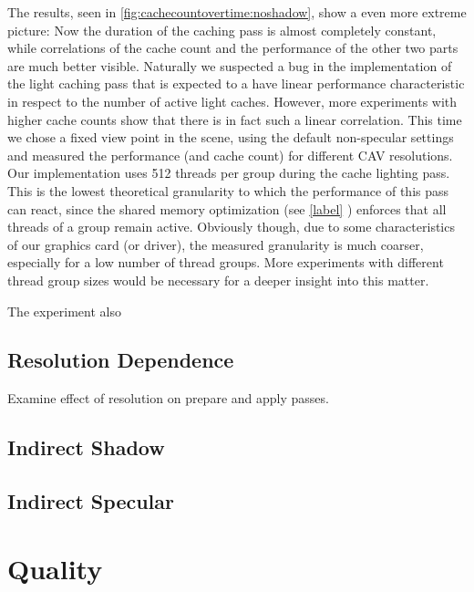 \documentclass[thesis.tex]{subfiles}
\begin{document}
The results, seen in \autoref{fig:cachecountovertime:noshadow}, show a even more extreme picture:
Now the duration of the caching pass is almost completely constant, while correlations of the cache count and the performance of the other two parts are much better visible.
Naturally we suspected a bug in the implementation of the light caching pass that is expected to a have linear performance characteristic in respect to the number of active light caches.
However, more experiments with higher cache counts show that there is in fact such a linear correlation.
This time we chose a fixed view point in the  scene, using the default non-specular settings and measured the performance (and cache count) for different CAV resolutions.
Our implementation uses 512 threads per group during the cache lighting pass.
This is the lowest theoretical granularity to which the performance of this pass can react, since the shared memory optimization (see \autoref{label} \todo{}) enforces that all threads of a group remain active.
Obviously though, due to some characteristics of our graphics card (or driver), the measured granularity is much coarser, especially for a low number of thread groups.
More experiments with different thread group sizes would be necessary for a deeper insight into this matter.

The experiment also %




\subsection{Resolution Dependence}
Examine effect of resolution on prepare and apply passes.

\subsection{Indirect Shadow}


\subsection{Indirect Specular}

\newpage

\section{Quality}
\end{document}
